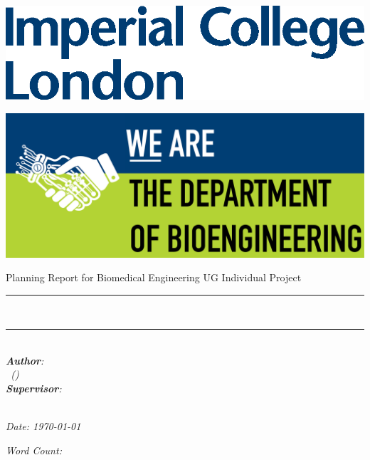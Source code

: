 \begin{titlepage}
\Large

\begin{minipage}{0.4\textwidth}
    \includegraphics[width=\textwidth]{figures/Imperial.eps}
\end{minipage}
\hfill
\begin{minipage}{0.4\textwidth}
    \includegraphics[width=.9\textwidth]{figures/Bioeng.png}
\end{minipage}

\vspace{1.5cm}

\begin{center}
    {\huge Planning Report for Biomedical Engineering UG Individual Project} \\ [1.5cm]
    \rule{.9\textwidth}{.1cm} \\[0.4cm]
    {\Huge \reporttitle}
    \rule{.9\textwidth}{.1cm} \\ [1.5cm]

    \textit{\textbf{Author}: \\ \reportauthor \ (\cid)} \\ [1cm]
    \textit{\textbf{Supervisor}: \\ \reportsupervisor} \\ [1cm]

    \vfill
    
    \begin{minipage}{0.5\textwidth}
    \centering
        \textit{Date: \today} \\ [1cm]
    \end{minipage}
    \hfill
    \begin{minipage}{0.4\textwidth}
    \centering
        \textit{Word Count: \wordcount} \\ [1cm]
    \end{minipage}
\end{center}

\end{titlepage}

